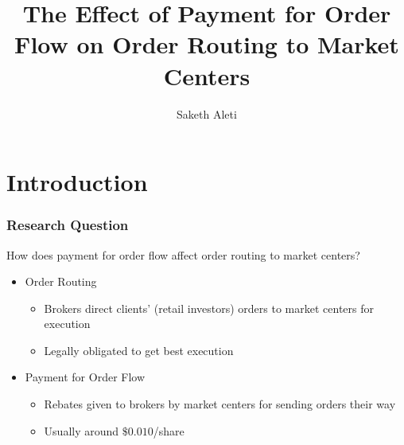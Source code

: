 \documentclass[11pt]{beamer}
\begin{document}
	\author{Saketh Aleti}
	\title{The Effect of Payment for Order Flow on Order Routing to Market Centers}
	\begin{frame}[plain]
	\maketitle
\end{frame}

\section{Introduction}

\begin{frame}
\frametitle{Research Question}

	\begin{block}
		{How does payment for order flow affect order routing to market centers?}	
	\end{block}

	\begin{itemize}
		\item Order Routing
		\begin{itemize}
			\item Brokers direct clients' (retail investors) orders to market centers for execution
			\item Legally obligated to get best execution
		\end{itemize}
		\item Payment for Order Flow
		\begin{itemize}
			\item Rebates given to brokers by market centers for sending orders their way
			\item Usually around $\$0.010$/share 
		\end{itemize}
	\end{itemize}

\end{frame}
\end{document}
